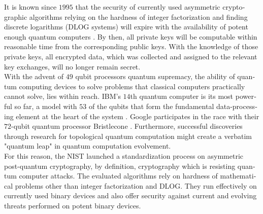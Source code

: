 \documentclass[a4paper,11pt]{article}
\begin{document}
\begin{otherlanguage}{english}

\vspace{3mm}
\begin{multicols}{2}
\noindent



\vspace{0.1cm}

\noindent
It is known since $1995$ that the security of currently used asymmetric cryptographic algorithms relying on the hardness of integer factorization and finding discrete logarithms (DLOG systems) will expire with the availability of potent enough quantum computers \cite{SHO}. By then, all private keys will be computable within reasonable time from the corresponding public keys. With the knowledge of those private keys, all encrypted data, which was collected and assigned to the relevant key exchanges, will no longer remain secret. \\

\noindent
With the advent of $49$ qubit processors quantum supremacy, the ability of quantum computing devices to solve problems that classical computers practically cannot solve,  lies within reach. IBM's $14$th quantum computer is its most powerful so far, a model with $53$ of the qubits that form the fundamental data-processing element at the heart of the system \cite{MSN}. Google participates in the race with their $72$-qubit quantum processor Bristlecone \cite{googleai}.  Furthermore, successful discoveries through research for topological quantum computation \cite{TQB} might create a verbatim "quantum leap" in quantum computation evolvement. \\

\noindent
For this reason, the NIST launched a standardization process on asymmetric post-quantum cryptography, by definition, cryptography which is resisting quantum computer attacks. The evaluated algorithms rely on hardness of mathematical problems other than integer factorization and DLOG. They run effectively on currently used binary devices and also offer security against current and evolving threats performed on potent binary devices.\\


\end{multicols}
\end{otherlanguage}
\end{document}
